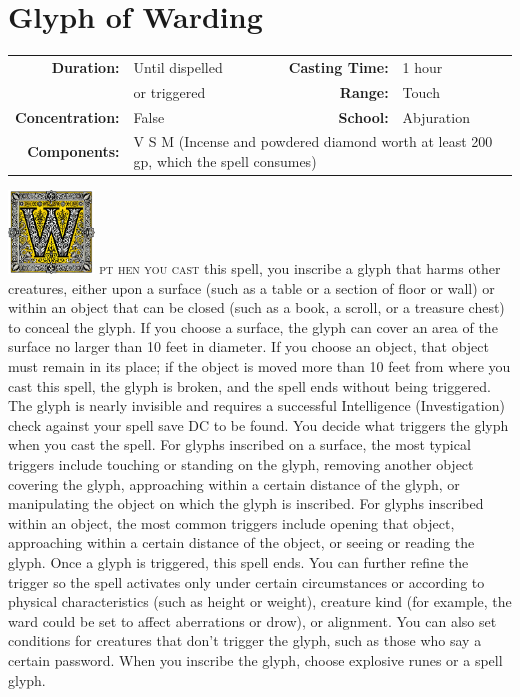 \documentclass[12pt,showtrims]{memoir}
\begin{document}
\newpage
\section*{Glyph of Warding}
{
\small\centering\vspace{-6pt}
\begin{tabular}{rlrl}
\toprule

\textbf{Duration:} & Until dispelled & \textbf{Casting Time:} & 1 hour \\
                   & or triggered  & \textbf{Range:} & Touch \\
\textbf{Concentration:} & False & \textbf{School:} & Abjuration \\
\textbf{Components:} & \multicolumn{3}{p{0.7\textwidth}}{ V S M (Incense and powdered diamond worth at least 200 gp, which the spell consumes)}\\

\bottomrule
\end{tabular}
}

\enlargethispage{1\baselineskip}
\noindent
\lettrine[lines=4]{\includegraphics[height=63pt]{initials/W.png}}{ pt hen you cast} this spell, you inscribe a glyph that harms other creatures, either upon a surface (such as a table or a section of floor or wall) or within an object that can be closed (such as a book, a scroll, or a treasure chest) to conceal the glyph. If you choose a surface, the glyph can cover an area of the surface no larger than 10 feet in diameter. If you choose an object, that object must remain in its place; if the object is moved more than 10 feet from where you cast this spell, the glyph is broken, and the spell ends without being triggered. The glyph is nearly invisible and requires a successful Intelligence (Investigation) check against your spell save DC to be found. You decide what triggers the glyph when you cast the spell. For glyphs inscribed on a surface, the most typical triggers include touching or standing on the glyph, removing another object covering the glyph, approaching within a certain distance of the glyph, or manipulating the object on which the glyph is inscribed. For glyphs inscribed within an object, the most common triggers include opening that object, approaching within a certain distance of the object, or seeing or reading the glyph. Once a glyph is triggered, this spell ends. You can further refine the trigger so the spell activates only under certain circumstances or according to physical characteristics (such as height or weight), creature kind (for example, the ward could be set to affect aberrations or drow), or alignment. You can also set conditions for creatures that don’t trigger the glyph, such as those who say a certain password. When you inscribe the glyph, choose explosive runes or a spell glyph. 
\end{document}
